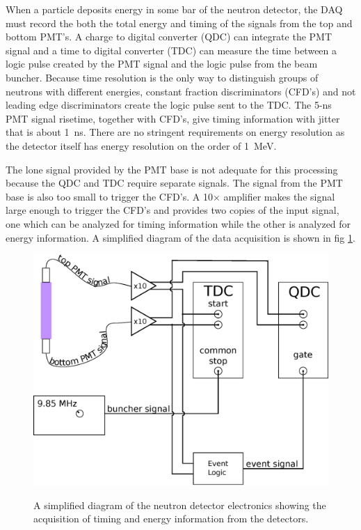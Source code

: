  When a particle deposits energy in some bar of the neutron detector, the DAQ must record the both the total energy and timing of the signals from the top and bottom PMT's.  A charge to digital converter (QDC) can integrate the PMT signal and a time to digital converter (TDC) can measure the time between a logic pulse created by the PMT signal and the logic pulse from the beam buncher.  Because time resolution is the only way to distinguish groups of neutrons with different energies, constant fraction discriminators (CFD's) and not leading edge discriminators create the logic pulse sent to the TDC.  The 5-ns PMT signal risetime, together with CFD's, give timing information with jitter that is about 1~ns.  There are no stringent requirements on energy resolution as the detector itself has energy resolution on the order of 1~MeV.

The lone signal provided by the PMT base is not adequate for this processing because the QDC and TDC require separate signals.  The signal from the PMT base is also too small to trigger the CFD's.  A 10$\times$ amplifier makes the signal large enough to trigger the CFD's and provides two copies of the input signal, one which can be analyzed for timing information while the other is analyzed for energy information.  A simplified diagram of the data acquisition is shown in fig \ref{fig:simpleElectronics}.

\begin{figure}[htp]
\centering
\includegraphics[width=1.0\textwidth]{figures/basic_electronics.eps}
\label{fig:simpleElectronics}
\caption{A simplified diagram of the neutron detector electronics showing the acquisition of timing and energy information from the detectors.}
\end{figure}

